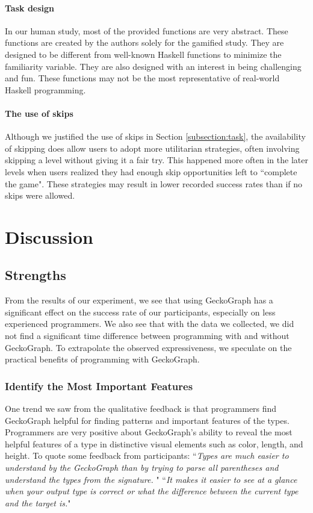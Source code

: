 \documentclass[preprint,12pt]{elsarticle}
\begin{document}
\paragraph{Task design}
In our human study, most of the provided functions are very abstract. These functions are created by the authors solely for the gamified study. They are designed to be different from well-known Haskell functions to minimize the familiarity variable. They are also designed with an interest in being challenging and fun. These functions may not be the most representative of real-world Haskell programming. 

\paragraph{The use of skips}
Although we justified the use of skips in Section \ref{subsection:task}, the availability of skipping does allow users to adopt more utilitarian strategies, often involving skipping a level without giving it a fair try. This happened more often in the later levels when users realized they had enough skip opportunities left to ``complete the game". These strategies may result in lower recorded success rates than if no skips were allowed.

\section{Discussion} \label{sec:discussion}
\subsection{Strengths}
From the results of our experiment, we see that using GeckoGraph has a significant effect on the success rate of our participants, especially on less experienced programmers. We also see that with the data we collected, we did not find a significant time difference between programming with and without GeckoGraph. To extrapolate the observed expressiveness, we speculate on the practical benefits of programming with GeckoGraph.

\subsubsection{Identify the Most Important Features}
One trend we saw from the qualitative feedback is that programmers find GeckoGraph helpful for finding patterns and important features of the types. Programmers are very positive about GeckoGraph's ability to reveal the most helpful features of a type in distinctive visual elements such as color, length, and height.
To quote some feedback from participants: ``{\it Types are much easier to understand by the GeckoGraph than by trying to parse all parentheses and understand the types from the signature.} " ``{\it It makes it easier to see at a glance when your output type is correct or what the difference between the current type and the target is.}"
\end{document}
